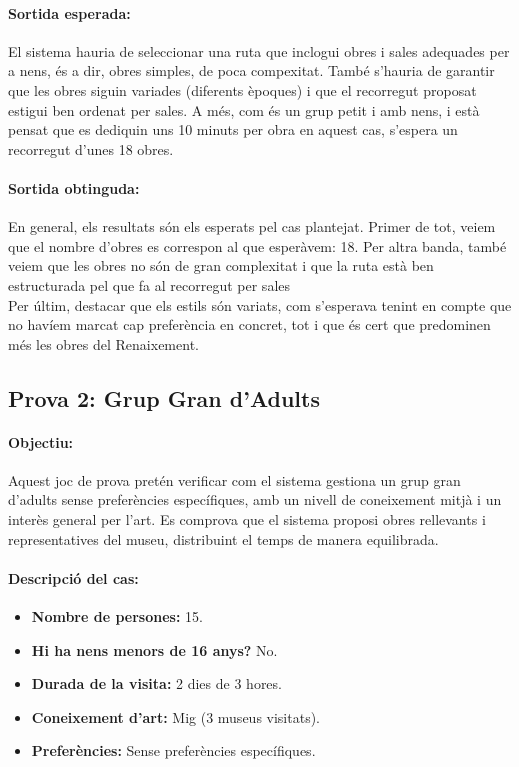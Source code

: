 \documentclass[a4paper]{article}
\begin{document}
	\paragraph{Sortida esperada:}
	El sistema hauria de seleccionar una ruta que inclogui obres i sales adequades per a nens, és a dir, obres simples, de poca compexitat. També s’hauria de garantir que les obres siguin variades (diferents èpoques) i que el recorregut proposat estigui ben ordenat per sales. A més, com és un grup petit i amb nens, i està pensat que es dediquin uns 10 minuts per obra en aquest cas, s'espera un recorregut d'unes 18 obres.
	
	\paragraph{Sortida obtinguda:}
	En general, els resultats són els esperats pel cas plantejat. Primer de tot, veiem que el nombre d'obres es correspon al que esperàvem: 18. Per altra banda, també veiem que les obres no són de gran complexitat i que la ruta està ben estructurada pel que fa al recorregut per sales \\
	
	Per últim, destacar que els estils són variats, com s'esperava tenint en compte que no havíem marcat cap preferència en concret, tot i que és cert que predominen més les obres del Renaixement.
	
	\subsection{Prova 2: Grup Gran d’Adults}
	
	\paragraph{Objectiu:} 
	Aquest joc de prova pretén verificar com el sistema gestiona un grup gran d’adults sense preferències específiques, amb un nivell de coneixement mitjà i un interès general per l’art. Es comprova que el sistema proposi obres rellevants i representatives del museu, distribuint el temps de manera equilibrada.
	
	\paragraph{Descripció del cas:} 
	
	\begin{itemize}
		\item \textbf{Nombre de persones:} 15.
		\item \textbf{Hi ha nens menors de 16 anys?} No.
		\item \textbf{Durada de la visita:} 2 dies de 3 hores.
		\item \textbf{Coneixement d’art:} Mig (3 museus visitats).
		\item \textbf{Preferències:} Sense preferències específiques.
	\end{itemize}
	
\end{document}
